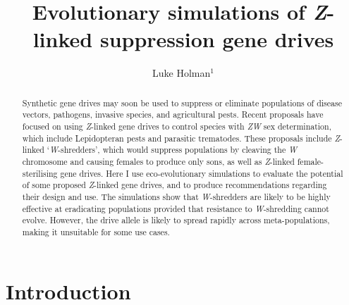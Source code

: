 \documentclass[]{rsos}%
\begin{document}
\title{Evolutionary simulations of \emph{Z}-linked suppression gene drives}

\author{
Luke Holman$^{1}$}

\address{
  $^{1}$School of BioSciences, The University of Melbourne, Victoria 3010,
Australia.}
\subject{
Evolutionary biology,
Theoretical modelling,
Gene drives}



\begin{abstract}
Synthetic gene drives may soon be used to suppress or eliminate
populations of disease vectors, pathogens, invasive species, and
agricultural pests. Recent proposals have focused on using
\emph{Z}-linked gene drives to control species with \emph{ZW} sex
determination, which include Lepidopteran pests and parasitic
trematodes. These proposals include \emph{Z}-linked
`\emph{W}-shredders', which would suppress populations by cleaving the
\emph{W} chromosome and causing females to produce only sons, as well as
\emph{Z}-linked female-sterilising gene drives. Here I use
eco-evolutionary simulations to evaluate the potential of some proposed
\emph{Z}-linked gene drives, and to produce recommendations regarding
their design and use. The simulations show that \emph{W}-shredders are
likely to be highly effective at eradicating populations provided that
resistance to \emph{W}-shredding cannot evolve. However, the drive
allele is likely to spread rapidly across meta-populations, making it
unsuitable for some use cases.
\end{abstract}

\providecommand{\tightlist}{%
  \setlength{\itemsep}{0pt}\setlength{\parskip}{0pt}}
\providecommand{\EndFirstPage}{%
}

\maketitle

\hypertarget{introduction}{%
\section{Introduction}\label{introduction}}
\end{document}
